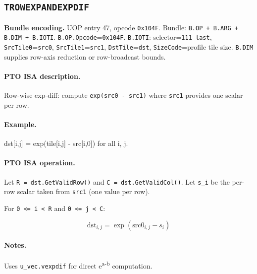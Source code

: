 \subsection{\texttt{TROWEXPANDEXPDIF}}
\noindent\textbf{Bundle encoding.} UOP entry 47, opcode \texttt{0x104F}. Bundle: \texttt{B.OP + B.ARG + B.DIM + B.IOTI}. \texttt{B.OP.Opcode}=\texttt{0x104F}. \texttt{B.IOTI}: selector=\texttt{111 last}, \texttt{SrcTile0}=\texttt{src0}, \texttt{SrcTile1}=\texttt{src1}, \texttt{DstTile}=\texttt{dst}, \texttt{SizeCode}=profile tile size. \texttt{B.DIM} supplies row-axis reduction or row-broadcast bounds.\par\smallskip
{\small
\paragraph{PTO ISA description.}
Row-wise exp-diff: compute \texttt{exp(src0 - src1)} where \texttt{src1} provides one scalar per row.
\paragraph{Example.}
dst[i,j] = exp(tile[i,j] - src[i,0]) for all i, j.
\par\smallskip
\paragraph{PTO ISA operation.}
Let \texttt{R = dst.GetValidRow()} and \texttt{C = dst.GetValidCol()}. Let \texttt{s\_i} be the per-row scalar taken from \texttt{src1} (one value per row).

For \texttt{0 \textless{}= i \textless{} R} and \texttt{0 \textless{}= j \textless{} C}:

\[
\mathrm{dst}_{i,j} = \exp(\mathrm{src0}_{i,j} - s_i)
\]
}\par\smallskip
\paragraph{Notes.}
Uses \texttt{u\_vec.vexpdif} for direct e\textsuperscript{a-b} computation.
